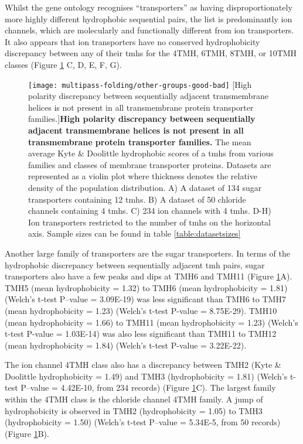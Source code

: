 Whilst the gene ontology recognises ``transporters'' as having disproportionately more highly different hydrophobic sequential pairs, the list is predominantly ion channels, which are molecularly and functionally different from ion transporters.
It also appears that ion transporters have no conserved hydrophobicity discrepancy between any of their \gls{tmh}s for the 4TMH, 6TMH, 8TMH, or 10TMH classes (Figure \ref{fig:other-groups-good-bad} C, D, E, F, G).

\begin{figure}[!ht]
\centering
\texttt{[image: multipass-folding/other-groups-good-bad]}
		[High polarity discrepancy between sequentially adjacent transmembrane helices is not present in all transmembrane protein transporter families.]{\textbf{High polarity discrepancy between sequentially adjacent transmembrane helices is not present in all transmembrane protein transporter families.}
    The mean average Kyte \& Doolittle hydrophobic scores of a \gls{tmh}s from various families and classes of membrane transporter proteins.
    Datasets are represented as a violin plot where thickness denotes the relative density of the population distribution.
    A) A dataset of  134 sugar transporters containing 12 \gls{tmh}s.
    B) A dataset of 50 chloride channels containing 4 \gls{tmh}s.
    C) 234 ion channels with 4 \gls{tmh}s.
    D-H) Ion transporters restricted to the number of \gls{tmh}s on the horizontal axis.
    Sample sizes can be found in table \ref{table:datasetsizes}}

\label{fig:other-groups-good-bad}
\end{figure}

Another large family of transporters are the sugar transporters.
In terms of the hydrophobic discrepancy between sequentially adjacent \gls{tmh} pairs, sugar transporters also have a few peaks and dips at TMH6 and TMH11 (Figure \ref{fig:other-groups-good-bad}A).
TMH5 (mean hydrophobicity = 1.32) to TMH6 (mean hydrophobicity = 1.81) (Welch's t\--test P\---value = 3.09E-19) was less significant than TMH6 to TMH7 (mean hydrophobicity = 1.23) (Welch's t\--test P\--value = 8.75E-29).
TMH10 (mean hydrophobicity = 1.66) to TMH11 (mean hydrophobicity = 1.23) (Welch's t\--test P\--value = 1.03E-14) was also less significant than TMH11 to TMH12 (mean hydrophobicity = 1.84) (Welch's t\--test P\--value = 3.22E-22).

The ion channel 4TMH class also has a discrepancy between TMH2 (Kyte \& Doolittle hydrophobicity = 1.49) and TMH3 (hydrophobicity = 1.81) (Welch's t\--test P\---value = 4.42E-10, from 234 records) (Figure \ref{fig:other-groups-good-bad}C).
The largest family within the 4TMH class is the chloride channel 4TMH family.
A jump of hydrophobicity is observed in TMH2 (hydrophobicity = 1.05) to TMH3 (hydrophobicity = 1.50) (Welch's t\--test P\---value = 5.34E-5, from 50 records) (Figure \ref{fig:other-groups-good-bad}B).

